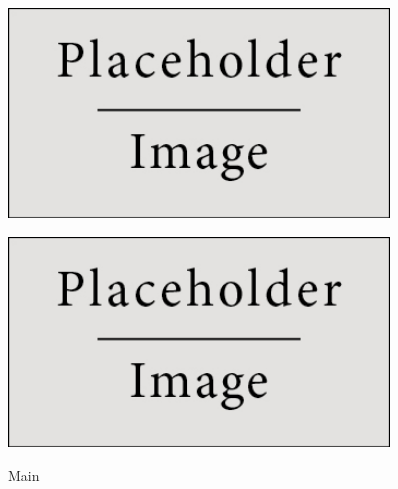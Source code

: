 \documentclass[11pt,twoside,a4paper]{report}
\begin{document}
\begin{figure}[H]
	\centering
	\begin{minipage}{.5\textwidth}
		\begin{center}
			\includegraphics[width=0.9\textwidth]{placeholder} %
			\label{fig:login2}
		\end{center}
	\end{minipage}%
	\begin{minipage}{.5\textwidth}
		\begin{center}
			\includegraphics[width=0.9\textwidth]{placeholder} %
			\label{fig:login3}
		\end{center}
	\end{minipage}
	\caption{Main}
	\label{fig:login1}
\end{figure}
\end{document}
